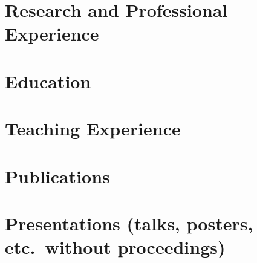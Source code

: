 \documentclass[10pt,a4paper,sans]{moderncv}
\begin{document}
\makecvtitle

\section*{}


\section{Research and Professional Experience}


\section{Education}


\section{Teaching Experience}


\section{Publications}


\section{Presentations {\footnotesize (talks, posters, etc.~without proceedings)}}
%
%
\end{document}
